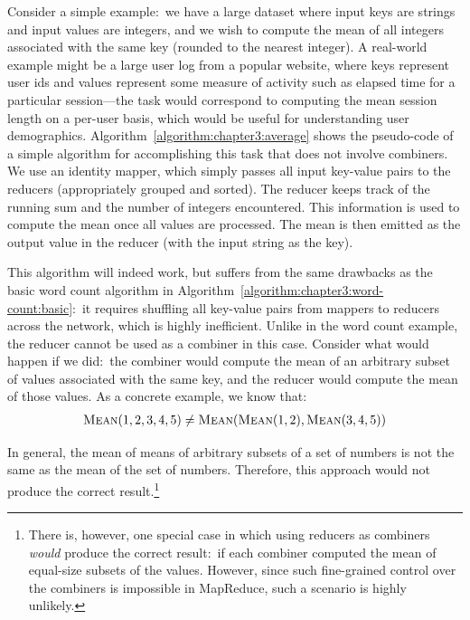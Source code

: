 Consider a simple example:\ we have a large dataset where input keys
are strings and input values are integers, and we wish to compute the
mean of all integers associated with the same key (rounded to the
nearest integer).  A real-world example might be a large user log from
a popular website, where keys represent user ids and values represent
some measure of activity such as elapsed time for a particular
session---the task would correspond to computing the mean session
length on a per-user basis, which would be useful for understanding
user demographics.  Algorithm~\ref{algorithm:chapter3:average} shows the
pseudo-code of a simple algorithm for accomplishing this task that
does not involve combiners.  We use an identity mapper, which simply
passes all input key-value pairs to the reducers (appropriately
grouped and sorted).  The reducer keeps track of the running sum and
the number of integers encountered.  This information is used to
compute the mean once all values are processed.  The mean is then
emitted as the output value in the reducer (with the input string as
the key).

This algorithm will indeed work, but suffers from the same drawbacks
as the basic word count algorithm in
Algorithm~\ref{algorithm:chapter3:word-count:basic}:\ it requires shuffling
all key-value pairs from mappers to reducers across the network, which
is highly inefficient.  Unlike in the word count example, the reducer
cannot be used as a combiner in this case.  Consider what would happen
if we did:\ the combiner would compute the mean of an arbitrary subset
of values associated with the same key, and the reducer would compute
the mean of those values.  As a concrete example, we know that:
\begin{align}
\textsc{Mean}(1, 2, 3, 4, 5) \ne \textsc{Mean}( \textsc{Mean}(1, 2), \textsc{Mean}(3, 4, 5))
\end{align}

\noindent In general, the mean of means of arbitrary subsets of a set
of numbers is not the same as the mean of the set of numbers.
Therefore, this approach would not produce the correct
result.\footnote{There is, however, one special case in which using
  reducers as combiners \emph{would} produce the correct result:\ if
  each combiner computed the mean of equal-size subsets of the values.
  However, since such fine-grained control over the combiners is
  impossible in MapReduce, such a scenario is highly unlikely.}

